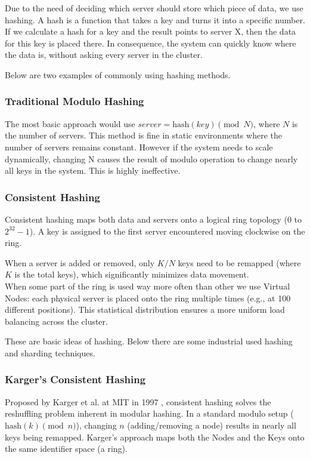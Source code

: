 \documentclass[shortabstract]{iithesis}
\begin{document}
Due to the need of deciding which server should store which piece of data, we use hashing. A hash is a function that takes a key and turns it into a specific number. If we calculate a hash for a key and the result points to server X, then the data for this key is placed there. In consequence, the system can quickly know where the data is, without asking every server in the cluster.

Below are two examples of commonly using hashing methods.

\subsubsection{Traditional Modulo Hashing}
The most basic approach would use $server = \text{hash}(key) \pmod N$, where $N$ is the number of servers. This method is fine in static environments where the number of servers remains constant. However if the system needs to scale dynamically, changing N causes the result of modulo operation to change nearly all keys in the system. This is highly ineffective.

\subsubsection{Consistent Hashing}
Consistent hashing maps both data and servers onto a logical ring topology ($0$ to $2^{32}-1$). A key is assigned to the first server encountered moving clockwise on the ring. \cite{karger}

When a server is added or removed, only $K/N$ keys need to be remapped (where $K$ is the total keys), which significantly minimizes data movement.\\
When some part of the ring is used way more often than other we use Virtual Nodes: each physical server is placed onto the ring multiple times (e.g., at 100 different positions). This statistical distribution ensures a more uniform load balancing across the cluster.

These are basic ideas of hashing. Below there are some industrial used hashing and sharding techniques.

\subsubsection{Karger's Consistent Hashing}
Proposed by Karger et al. at MIT in 1997 \cite{karger}, consistent hashing solves the reshuffling problem inherent in modular hashing. In a standard modulo setup ($\text{hash}(k) \pmod n$), changing $n$ (adding/removing a node) results in nearly all keys being remapped.
Karger's approach maps both the Nodes and the Keys onto the same identifier space (a ring).
\end{document}
